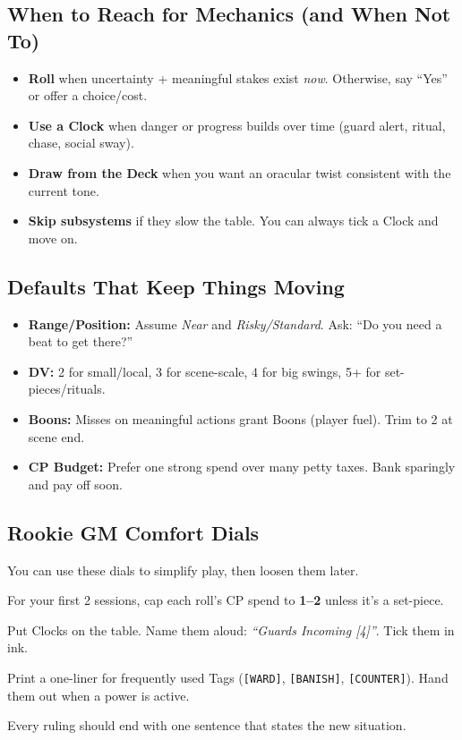 \subsection{When to Reach for Mechanics (and When Not To)}
\begin{itemize}
  \item \textbf{Roll} when uncertainty + meaningful stakes exist \emph{now}. Otherwise, say ``Yes'' or offer a choice/cost.
  \item \textbf{Use a Clock} when danger or progress builds over time (guard alert, ritual, chase, social sway).
  \item \textbf{Draw from the Deck} when you want an oracular twist consistent with the current tone.
  \item \textbf{Skip subsystems} if they slow the table. You can always tick a Clock and move on.
\end{itemize}

\subsection{Defaults That Keep Things Moving}
\begin{itemize}
  \item \textbf{Range/Position:} Assume \emph{Near} and \emph{Risky/Standard}. Ask: ``Do you need a beat to get there?''
  \item \textbf{DV:} 2 for small/local, 3 for scene-scale, 4 for big swings, 5+ for set-pieces/rituals.
  \item \textbf{Boons:} Misses on meaningful actions grant Boons (player fuel). Trim to 2 at scene end.
  \item \textbf{CP Budget:} Prefer one strong spend over many petty taxes. Bank sparingly and pay off soon.
\end{itemize}

\subsection{Rookie GM Comfort Dials}
You can use these dials to simplify play, then loosen them later.
\begin{description}[leftmargin=1.5em, style=nextline]
  \item[Soft CP:] For your first 2 sessions, cap each roll’s CP spend to \textbf{1--2} unless it’s a set-piece.
  \item[Visible Clocks:] Put Clocks on the table. Name them aloud: \emph{``Guards Incoming [4]''}. Tick them in ink.
  \item[Tag Cards:] Print a one-liner for frequently used Tags (\texttt{[WARD]}, \texttt{[BANISH]}, \texttt{[COUNTER]}). Hand them out when a power is active.
  \item[One Move, One Sentence:] Every ruling should end with one sentence that states the new situation.
\end{description}


